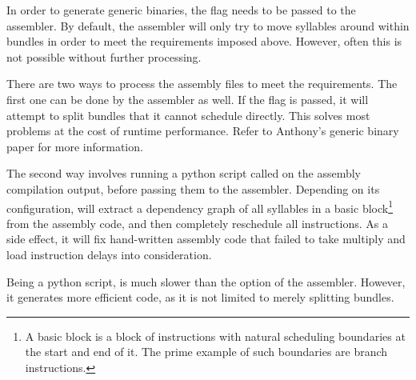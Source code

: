 In order to generate generic binaries, the  flag needs to be passed to
the assembler. By default, the assembler will only try to move syllables around
within bundles in order to meet the requirements imposed above. However, often
this is not possible without further processing.

There are two ways to process the assembly files to meet the requirements. The
first one can be done by the assembler as well. If the  flag
is passed, it will attempt to split bundles that it cannot schedule directly.
This solves most problems at the cost of runtime performance. Refer to Anthony's
generic binary paper
for more information.

The second way involves running a python script called  on the 
assembly compilation output, before passing them to the assembler. Depending on 
its configuration,  will extract a dependency graph of all 
syllables in a basic block\footnote{A basic block is a block of instructions 
with natural scheduling boundaries at the start and end of it. The prime example 
of such boundaries are branch instructions.} from the assembly code, and then 
completely reschedule all instructions. As a side effect, it will fix 
hand-written assembly code that failed to take multiply and load instruction 
delays into consideration.

Being a python script,  is much slower than the 
 option of the assembler. However, it generates more efficient 
code, as it is not limited to merely splitting bundles.
